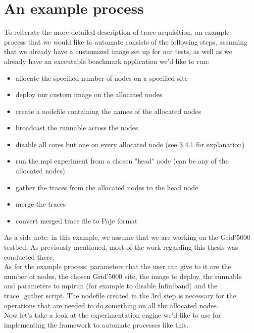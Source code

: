 \section{An example process}
\label{sec:example_process}
To reiterate the more detailed description of trace acquisition, an
example process that we would like to automate consists of the
following steps, assuming that we already have a customized image set
up for our tests, as well as we already have an executable benchmark
application we'd like to run:
\begin{itemize}
\item allocate the specified number of nodes on a specified site
\item deploy our custom image on the allocated nodes
\item create a nodefile containing the names of the allocated nodes
\item broadcast the runnable across the nodes
\item disable all cores but one on every allocated node (see 3.4.1 for
  explanation)
\item run the mpi experiment from a chosen "head" node (can be any of
  the allocated nodes)
\item gather the traces from the allocated nodes to the head node
\item merge the traces
\item convert merged trace file to Paje format
\end{itemize}
As a side note: in this example, we assume that we are working on the
Grid'5000 testbed. As previously mentioned, most of the work regarding
this thesis was conducted there.\\
As for the example process: parameters that the user can give to it
are the number of nodes, the chosen Grid'5000 site, the image to
deploy, the runnable and parameters to mpirun (for example to disable
Infiniband) and the trace\_gather script. The nodefile created in the
3rd step is necessary for the operations that are needed to do
something on all the allocated nodes.\\
Now let's take a look at the experimentation engine we'd like to use
for implementing the framework to automate processes like this.
